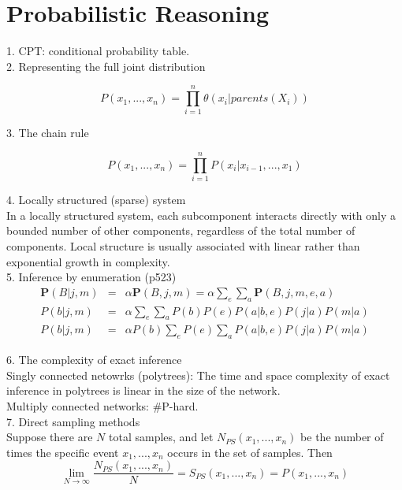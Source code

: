 \documentclass[12pt]{article}
\begin{document}
\section{Probabilistic Reasoning}

1. CPT: conditional probability table. \\

2. Representing the full joint distribution

\begin{equation*}
P(x_1,...,x_n) = \prod^n_{i=1} \theta(x_i | parents(X_i))
\end{equation*}

3. The chain rule

\begin{equation*}
P(x_1,...,x_n) = \prod^n_{i=1} P(x_i | x_{i-1},...,x_1)
\end{equation*}

4. Locally structured (sparse) system \\

In a locally structured system, each subcomponent interacts directly with only a bounded number of other components, regardless of the total number of components. Local structure is usually associated with linear rather than exponential growth in complexity. \\

5. Inference by enumeration (p523)
\begin{eqnarray*}
\boldsymbol{P}(B|j,m)
&=& \alpha \boldsymbol{P}(B,j,m)
= \alpha \sum_e \sum_a \boldsymbol{P}(B,j,m,e,a) \\
P(b|j,m)
&=& \alpha \sum_e \sum_a P(b) P(e) P(a|b,e) P(j|a) P(m|a) \\
P(b|j,m)
&=& \alpha P(b) \sum_e P(e) \sum_a P(a|b,e) P(j|a) P(m|a)
\end{eqnarray*}

6. The complexity of exact inference \\

Singly connected netowrks (polytrees): The time and space complexity of exact inference in polytrees is linear in the size of the network. \\

Multiply connected networks: \#P-hard. \\

7. Direct sampling methods \\

Suppose there are $N$ total samples, and let $N_{PS}(x_1,...,x_n)$ be the number of times the specific event $x_1,...,x_n$ occurs in the set of samples. Then
\begin{equation*}
  \lim_{N\rightarrow \infty} \frac {N_{PS}(x_1,...,x_n)}{N}
  = S_{PS}(x_1,...,x_n) = P(x_1,...,x_n)
\end{equation*}
\end{document}
